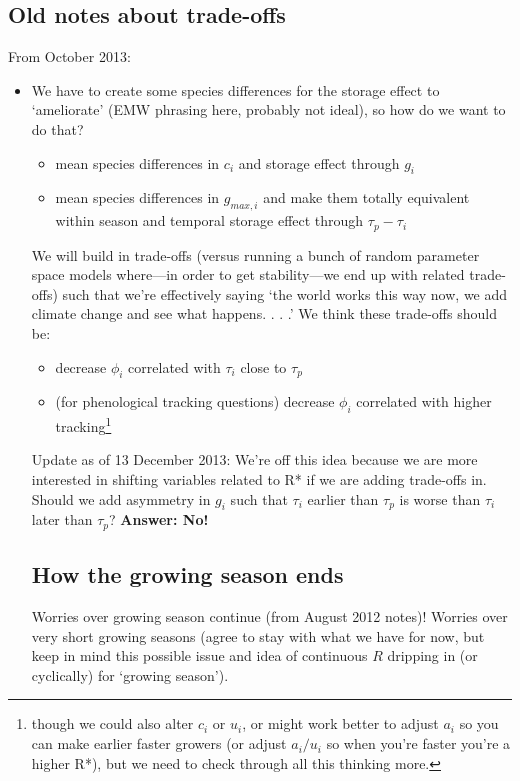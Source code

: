 \documentclass[11pt,a4paper,oneside]{article}
\begin{document}
\subsection{Old notes about trade-offs}
From October 2013:
\begin{itemize}
\item We have to create some species differences for the storage effect to `ameliorate' (EMW phrasing here, probably not ideal), so how do we want to do that?
\begin{itemize}
\item mean species differences in \(c_{i}\) and storage effect through \(g_{i}\) 
\item mean species differences in \(g_{max,i}\) and make them totally equivalent within season and temporal storage effect through \(\tau_{p}-\tau_{i}\) 
\end{itemize}

 We will build in trade-offs (versus running a bunch of random parameter space models where---in order to get stability---we end up with related trade-offs) such that we're effectively saying `the world works this way now, we add climate change and see what happens. . . .' We think these trade-offs should be:
\begin{itemize}
\item decrease \(\phi_{i}\) correlated with  \(\tau_{i}\) close to  \(\tau_{p}\)
\item (for phenological tracking questions) decrease \(\phi_{i}\) correlated with higher tracking\footnote{though we could also alter \(c_{i}\) or \(u_{i}\), or might work better to adjust \(a_{i}\) so you can make earlier faster growers (or adjust \(a_{i}/u_{i}\) so when you're faster you're a higher R*), but we need to check through all this thinking more.}
\end{itemize}
Update as of 13 December 2013: We're off this idea because we are more interested in shifting variables related to R* if we are adding trade-offs in.\\

 Should we add asymmetry in \(g_{i}\) such that \(\tau_{i}\) earlier than \(\tau_{p}\) is worse than \(\tau_{i}\) later than \(\tau_{p}\)? {\bf Answer: No!}

\subsection{How the growing season ends}
Worries over growing season continue (from August 2012 notes)! Worries over very short growing seasons (agree to stay with what we have for now, but keep in mind this possible issue and idea of continuous $R$ dripping in (or cyclically) for `growing season').\\


\end{itemize}
\end{document}
